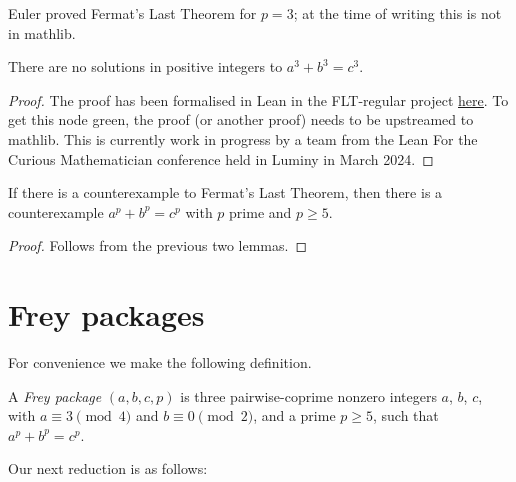 Euler proved Fermat's Last Theorem for $p=3$; at the time of writing this is not in mathlib.

\begin{lemma}\label{fermatLastTheoremThree}\leanok
{}
  There are no solutions in positive integers to $a^3+b^3=c^3$.
\end{lemma}
\begin{proof}
  The proof has been formalised in Lean in the FLT-regular project \href{https://github.com/leanprover-community/flt-regular/blob/861b7df057140b45b8bb7d30d33426ffbbdda52b/FltRegular/FltThree/FltThree.lean#L698}{\underline{here}}. To get this node green, the proof (or another proof) needs to be upstreamed to mathlib. This is currently work in progress by a team from the Lean For the Curious Mathematician conference held in Luminy in March 2024.
\end{proof}

\begin{corollary}\label{p_ge_5_counterexample_of_not_FermatLastTheorem}\leanok If there is a counterexample to Fermat's Last Theorem, then there is a counterexample $a^p+b^p=c^p$ with $p$ prime and $p\geq 5$.
\end{corollary}
\begin{proof}\leanok Follows from the previous two lemmas.\end{proof}

\section{Frey packages}

For convenience we make the following definition.

\begin{definition}\label{FLT.Frey_package}\leanok A \emph{Frey package} $(a,b,c,p)$ is three pairwise-coprime nonzero integers $a$, $b$, $c$, with $a\equiv3\pmod4$ and $b\equiv0\pmod2$, and a prime $p\geq5$, such that $a^p+b^p=c^p$.\end{definition}

Our next reduction is as follows:

